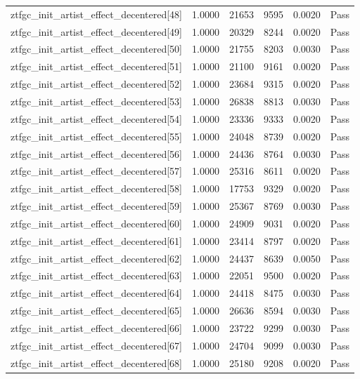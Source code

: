 \begin{table}[htbp]
\begin{tabular}{llrrll}
ztfgc\_init\_artist\_effect\_decentered[48] & 1.0000 & 21653 & 9595 & 0.0020 & Pass \\
ztfgc\_init\_artist\_effect\_decentered[49] & 1.0000 & 20329 & 8244 & 0.0020 & Pass \\
ztfgc\_init\_artist\_effect\_decentered[50] & 1.0000 & 21755 & 8203 & 0.0030 & Pass \\
ztfgc\_init\_artist\_effect\_decentered[51] & 1.0000 & 21100 & 9161 & 0.0020 & Pass \\
ztfgc\_init\_artist\_effect\_decentered[52] & 1.0000 & 23684 & 9315 & 0.0020 & Pass \\
ztfgc\_init\_artist\_effect\_decentered[53] & 1.0000 & 26838 & 8813 & 0.0030 & Pass \\
ztfgc\_init\_artist\_effect\_decentered[54] & 1.0000 & 23336 & 9333 & 0.0020 & Pass \\
ztfgc\_init\_artist\_effect\_decentered[55] & 1.0000 & 24048 & 8739 & 0.0020 & Pass \\
ztfgc\_init\_artist\_effect\_decentered[56] & 1.0000 & 24436 & 8764 & 0.0030 & Pass \\
ztfgc\_init\_artist\_effect\_decentered[57] & 1.0000 & 25316 & 8611 & 0.0020 & Pass \\
ztfgc\_init\_artist\_effect\_decentered[58] & 1.0000 & 17753 & 9329 & 0.0020 & Pass \\
ztfgc\_init\_artist\_effect\_decentered[59] & 1.0000 & 25367 & 8769 & 0.0030 & Pass \\
ztfgc\_init\_artist\_effect\_decentered[60] & 1.0000 & 24909 & 9031 & 0.0020 & Pass \\
ztfgc\_init\_artist\_effect\_decentered[61] & 1.0000 & 23414 & 8797 & 0.0020 & Pass \\
ztfgc\_init\_artist\_effect\_decentered[62] & 1.0000 & 24437 & 8639 & 0.0050 & Pass \\
ztfgc\_init\_artist\_effect\_decentered[63] & 1.0000 & 22051 & 9500 & 0.0020 & Pass \\
ztfgc\_init\_artist\_effect\_decentered[64] & 1.0000 & 24418 & 8475 & 0.0030 & Pass \\
ztfgc\_init\_artist\_effect\_decentered[65] & 1.0000 & 26636 & 8594 & 0.0030 & Pass \\
ztfgc\_init\_artist\_effect\_decentered[66] & 1.0000 & 23722 & 9299 & 0.0030 & Pass \\
ztfgc\_init\_artist\_effect\_decentered[67] & 1.0000 & 24704 & 9099 & 0.0030 & Pass \\
ztfgc\_init\_artist\_effect\_decentered[68] & 1.0000 & 25180 & 9208 & 0.0020 & Pass \\

\end{tabular}
\end{table}
